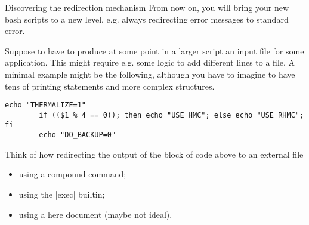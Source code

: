 
\begin{exercise}[Instructive]{Discovering the redirection mechanism}
    From now on, you will bring your new bash scripts to a new level, e.g. always redirecting error messages to standard error.
    
    Suppose to have to produce at some point in a larger script an input file for some application.
    This might require e.g. some logic to add different lines to a file.
    A minimal example might be the following, although you have to imagine to have tens of printing statements and more complex structures.
    \begin{lstlisting}[style=myBash]
        echo "THERMALIZE=1"
        if (($1 % 4 == 0)); then echo "USE_HMC"; else echo "USE_RHMC"; fi
        echo "DO_BACKUP=0"
    \end{lstlisting}
    
    Think of how redirecting the output of the block of code above to an external file
    \begin{itemize}[nosep]
        \item using a compound command;
        \item using the \bash|exec| builtin;
        \item using a here document (maybe not ideal).
    \end{itemize}
\end{exercise}